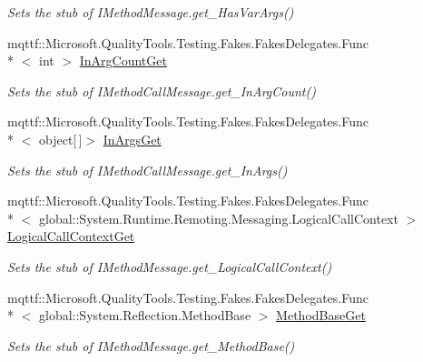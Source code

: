 \begin{DoxyCompactItemize}
\begin{DoxyCompactList}\small\item\em Sets the stub of I\-Method\-Message.\-get\-\_\-\-Has\-Var\-Args()\end{DoxyCompactList}\item 
mqttf\-::\-Microsoft.\-Quality\-Tools.\-Testing.\-Fakes.\-Fakes\-Delegates.\-Func\\*
$<$ int $>$ \hyperlink{class_system_1_1_runtime_1_1_remoting_1_1_activation_1_1_fakes_1_1_stub_i_construction_call_message_af157e9677748add9db7438e6d72372ac}{In\-Arg\-Count\-Get}
\begin{DoxyCompactList}\small\item\em Sets the stub of I\-Method\-Call\-Message.\-get\-\_\-\-In\-Arg\-Count()\end{DoxyCompactList}\item 
mqttf\-::\-Microsoft.\-Quality\-Tools.\-Testing.\-Fakes.\-Fakes\-Delegates.\-Func\\*
$<$ object\mbox{[}$\,$\mbox{]}$>$ \hyperlink{class_system_1_1_runtime_1_1_remoting_1_1_activation_1_1_fakes_1_1_stub_i_construction_call_message_a414ea5c6c5b3b577b36c6767d8a1ffa9}{In\-Args\-Get}
\begin{DoxyCompactList}\small\item\em Sets the stub of I\-Method\-Call\-Message.\-get\-\_\-\-In\-Args()\end{DoxyCompactList}\item 
mqttf\-::\-Microsoft.\-Quality\-Tools.\-Testing.\-Fakes.\-Fakes\-Delegates.\-Func\\*
$<$ global\-::\-System.\-Runtime.\-Remoting.\-Messaging.\-Logical\-Call\-Context $>$ \hyperlink{class_system_1_1_runtime_1_1_remoting_1_1_activation_1_1_fakes_1_1_stub_i_construction_call_message_a3a6420f4036a535ec50e7dab6e0e604a}{Logical\-Call\-Context\-Get}
\begin{DoxyCompactList}\small\item\em Sets the stub of I\-Method\-Message.\-get\-\_\-\-Logical\-Call\-Context()\end{DoxyCompactList}\item 
mqttf\-::\-Microsoft.\-Quality\-Tools.\-Testing.\-Fakes.\-Fakes\-Delegates.\-Func\\*
$<$ global\-::\-System.\-Reflection.\-Method\-Base $>$ \hyperlink{class_system_1_1_runtime_1_1_remoting_1_1_activation_1_1_fakes_1_1_stub_i_construction_call_message_ad25eb9a63408edb2f177accd542291db}{Method\-Base\-Get}
\begin{DoxyCompactList}\small\item\em Sets the stub of I\-Method\-Message.\-get\-\_\-\-Method\-Base()\end{DoxyCompactList}\item 

\end{DoxyCompactItemize}
